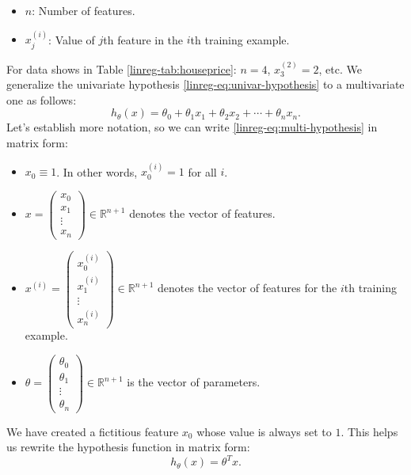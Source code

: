 \documentclass{article}
\theoremstyle{definition}
\begin{document}
\begin{itemize}
    \item $n$: Number of features.
    \item $x^{(i)}_{j}$: Value of $j$th feature in the $i$th training example.
\end{itemize}
For data shows in Table \ref{linreg-tab:houseprice}: $n=4$, $x^{(2)}_3=2$, etc. We generalize the univariate hypothesis \eqref{linreg-eq:univar-hypothesis} to a multivariate one as follows:
\begin{equation}
    h_{\theta}(x) = \theta_0 + \theta_1x_1 + \theta_2x_2 + \cdots + \theta_nx_n.
    \label{linreg-eq:multi-hypothesis}
\end{equation}
Let's establish more notation, so we can write \eqref{linreg-eq:multi-hypothesis} in matrix form:
\begin{itemize}
    \item $x_0 \equiv 1$. In other words, $x^{(i)}_0 = 1$ for all $i$.

    \item $x=
        \begin{pmatrix}
            x_0 \\
            x_1 \\
            \vdots \\
            x_n
        \end{pmatrix}
        \in \mathbb{R}^{n+1}
    $ denotes the vector of features.

    \item $x^{(i)}=
        \begin{pmatrix}
            x^{(i)}_0 \\
            x^{(i)}_1 \\
            \vdots \\
            x^{(i)}_n
        \end{pmatrix}
        \in \mathbb{R}^{n+1}
    $ denotes the vector of features for the $i$th training example. 

    \item $\theta =
        \begin{pmatrix}
            \theta_0 \\
            \theta_1 \\ 
            \vdots \\
            \theta_n
        \end{pmatrix}
        \in \mathbb{R}^{n+1}
    $ is the vector of parameters.
\end{itemize}
We have created a fictitious feature $x_0$ whose value is always set to $1$. This helps us rewrite the hypothesis function in matrix form:
\begin{equation}
    h_{\theta}(x) = \theta^Tx.
    \label{linreg-eq:multi-hypothesis-mat}
\end{equation}
\end{document}
